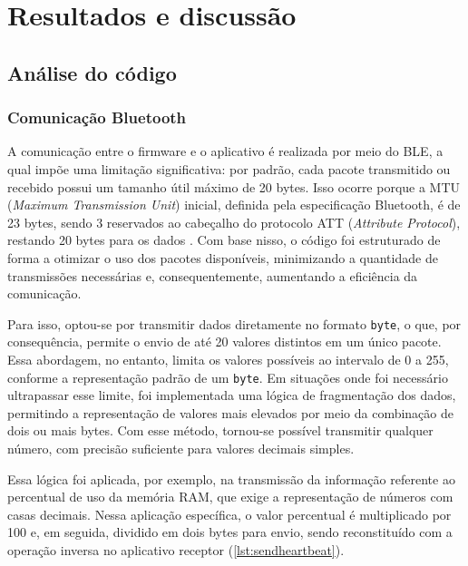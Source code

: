 \chapter[Resultados e discussão]{Resultados e discussão}

\section{Análise do código}
\subsection{Comunicação Bluetooth}

A comunicação entre o firmware e o aplicativo é realizada por meio do BLE, a qual impõe uma limitação significativa: por padrão, cada pacote transmitido ou recebido possui um tamanho útil máximo de 20 bytes. Isso ocorre porque a MTU (\textit{Maximum Transmission Unit}) inicial, definida pela especificação Bluetooth, é de 23 bytes, sendo 3 reservados ao cabeçalho do protocolo ATT (\textit{Attribute Protocol}), restando 20 bytes para os dados \cite{ble_memfault}. Com base nisso, o código foi estruturado de forma a otimizar o uso dos pacotes disponíveis, minimizando a quantidade de transmissões necessárias e, consequentemente, aumentando a eficiência da comunicação.

Para isso, optou-se por transmitir dados diretamente no formato \texttt{byte}, o que, por consequência, permite o envio de até 20 valores distintos em um único pacote. Essa abordagem, no entanto, limita os valores possíveis ao intervalo de 0 a 255, conforme a representação padrão de um \texttt{byte}. Em situações onde foi necessário ultrapassar esse limite, foi implementada uma lógica de fragmentação dos dados, permitindo a representação de valores mais elevados por meio da combinação de dois ou mais bytes. Com esse método, tornou-se possível transmitir qualquer número, com precisão suficiente para valores decimais simples.

Essa lógica foi aplicada, por exemplo, na transmissão da informação referente ao percentual de uso da memória RAM, que exige a representação de números com casas decimais. Nessa aplicação específica, o valor percentual é multiplicado por 100 e, em seguida, dividido em dois bytes para envio, sendo reconstituído com a operação inversa no aplicativo receptor (\autoref{lst:sendheartbeat}).



